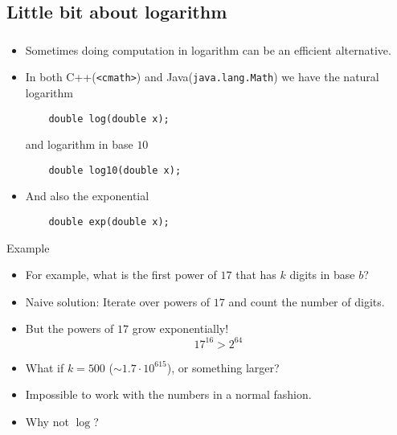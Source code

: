 \documentclass[10pt]{beamer}
\newcommand{\bi}{\begin{itemize}}
\newcommand{\ei}{\end{itemize}}
\begin{document}
\subsection{Little bit about logarithm}
\begin{frame}[fragile]
  \frametitle{\insertsubsection}
  \vspace{30pt}
  \bi
    \item Sometimes doing computation in logarithm can be an efficient alternative.

  \item In both C++(\texttt{\color{gray}<cmath>}) and
    Java(\texttt{\color{gray}java.lang.Math}) we have the natural logarithm
      \begin{verbatim}
    double log(double x);
      \end{verbatim}

      and logarithm in base $10$
      \begin{verbatim}
    double log10(double x);
      \end{verbatim}
  \item And also the exponential
    \begin{verbatim}
    double exp(double x);
    \end{verbatim}
  \ei
\end{frame}

\begin{frame}[fragile]{Example}
  \vspace{20pt}
  \bi
    \item For example, what is the first power of $17$ that has $k$ digits in base $b$?
    \item {\color{title}Naive solution}: Iterate over powers of $17$ and count the number of digits.
    \item But the powers of $17$ grow exponentially!
      \[17^{16} > 2^{64}\]
    \item What if $k = 500$ ($\sim1.7 \cdot 10^{615}$), or something larger?
    \item Impossible to work with the numbers in a normal fashion.
    \item Why not $\log$?
  \ei
\end{frame}
\end{document}
